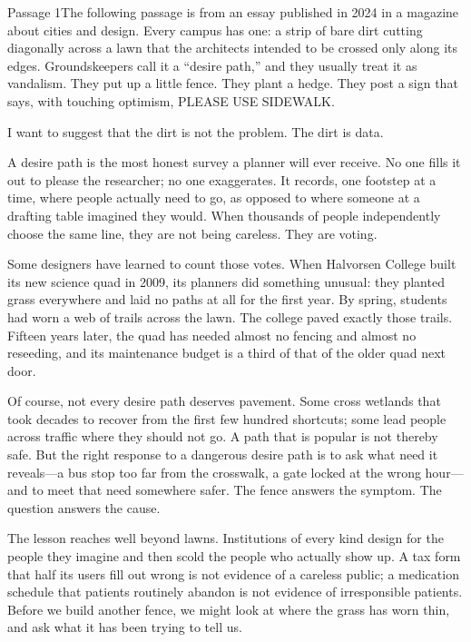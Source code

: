 \documentclass[11pt]{article}
\begin{document}
\begin{passage}{Passage 1}{The following passage is from an essay published in 2024 in a magazine about cities and design.}
 Every campus has one: a strip of bare dirt cutting diagonally across a lawn that the architects intended to be crossed only along its edges. Groundskeepers call it a ``desire path,'' and they usually treat it as vandalism. They put up a little fence. They plant a hedge. They post a sign that says, with touching optimism, PLEASE USE SIDEWALK.

 I want to suggest that the dirt is not the problem. The dirt is data.

 A desire path is the most honest survey a planner will ever receive. No one fills it out to please the researcher; no one exaggerates. It records, one footstep at a time, where people actually need to go, as opposed to where someone at a drafting table imagined they would. When thousands of people independently choose the same line, they are not being careless. They are voting.

 Some designers have learned to count those votes. When Halvorsen College built its new science quad in 2009, its planners did something unusual: they planted grass everywhere and laid no paths at all for the first year. By spring, students had worn a web of trails across the lawn. The college paved exactly those trails. Fifteen years later, the quad has needed almost no fencing and almost no reseeding, and its maintenance budget is a third of that of the older quad next door.

 Of course, not every desire path deserves pavement. Some cross wetlands that took decades to recover from the first few hundred shortcuts; some lead people across traffic where they should not go. A path that is popular is not thereby safe. But the right response to a dangerous desire path is to ask what need it reveals---a bus stop too far from the crosswalk, a gate locked at the wrong hour---and to meet that need somewhere safer. The fence answers the symptom. The question answers the cause.

 The lesson reaches well beyond lawns. Institutions of every kind design for the people they imagine and then scold the people who actually show up. A tax form that half its users fill out wrong is not evidence of a careless public; a medication schedule that patients routinely abandon is not evidence of irresponsible patients. Before we build another fence, we might look at where the grass has worn thin, and ask what it has been trying to tell us.
\end{passage}
\end{document}
